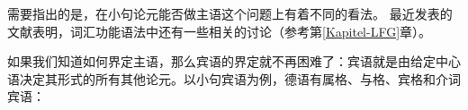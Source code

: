 
需要指出的是，在小句论元能否做主语这个问题上有着不同的看法。
最近发表的文献表明，词汇功能语法中还有一些相关的讨论（参考第\ref{Kapitel-LFG}章）\citep*{DL2000a-u,Berman2003b-u,Berman2007a-u,AMM2005a-u,Forst2006a-u}。  

如果我们知道如何界定主语，那么宾语的界定就不再困难了：宾语就是由给定中心语决定其形式的所有其他论元。以小句宾语为例，德语有属格、与格、宾格和介词宾语：


